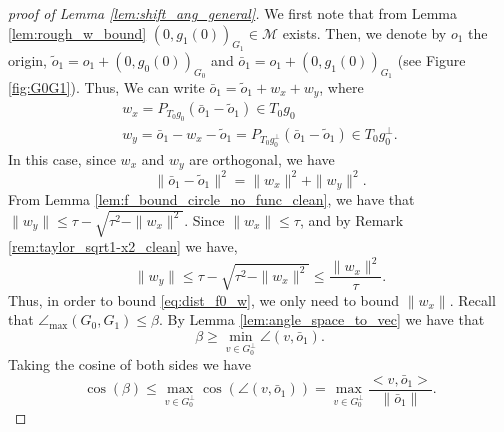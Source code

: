 \documentclass[12pt]{article}
\theoremstyle{remark}
\newcommand{\MM}{\mathcal{M}}
\newcommand{\maxangle}{\angle_{\max}}
\begin{document}
\begin{appendices}
\begin{proof}[proof of Lemma \ref{lem:shift_ang_general}] 
We first note that from Lemma \ref{lem:rough_w_bound} $(0,g_1(0))_{G_1}\in \MM$ exists.
Then, we denote by $o_1$ the origin, $\tilde o_1 = o_1 + (0, g_0(0))_{G_0}$ and $\bar o_1 = o_1 + (0, g_1(0))_{G_1}$ (see Figure \ref{fig:G0G1}).
Thus, We can write $\bar o_1 = \tilde o_1 + w_x + w_y$, where 
\[
\begin{array}{c}
w_x = P_{T_0g_0}(\bar o_1 - \tilde o_1) \in T_0g_0 \\ 
w_y = \bar o_1 - w_x - \tilde o_1 = P_{T_0g_0^\perp}(\bar o_1-\tilde o_1) \in T_0g_0^\perp.    
\end{array}
\]
In this case, since $w_x$ and $w_y$ are orthogonal, we have 
\begin{equation}\label{eq:dist_f0_w}
    \|\bar o_1 - \tilde o_1\|^2 = \|w_x\|^2 + \|w_y\|^2.
\end{equation}
From Lemma \ref{lem:f_bound_circle_no_func_clean}, we have that  $\|w_y\| \leq \tau - \sqrt{\tau^2 - \|w_x\|^2}$. Since $\|w_x\|\leq \tau$, and by Remark \ref{rem:taylor_sqrt1-x2_clean} we have,
\begin{equation}\label{eq:wy_bound}
    \|w_y\| \leq \tau - \sqrt{\tau^2 - \|w_x\|^2} \leq \frac{\|w_x\|^2}{\tau}.
\end{equation}
Thus, in order to bound \eqref{eq:dist_f0_w}, we only need to bound $\|w_x\|$. Recall that  $\maxangle(G_0,G_1)\leq \beta$. By Lemma \ref{lem:angle_space_to_vec} we have that 
\[
\beta \geq \min\limits_{v\in G_0^\perp} \angle (v,\bar o_1).
\]
Taking the cosine of both sides we have
\begin{equation}\label{eq:cos_bound_wx_norm}
    \cos\left(\beta\right)\leq \max\limits_{v\in G_0^\perp} \cos(\angle (v,\bar o_1)) =\max\limits_{v\in G_0^\perp} \frac{<v,\bar o_1>}{\|\bar o_1\|}.
\end{equation}
    

\end{proof}
\end{appendices}
\end{document}
